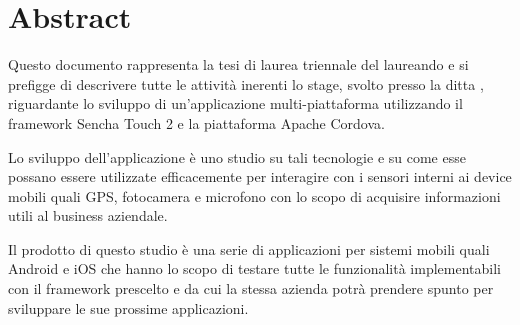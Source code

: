 \begingroup
\let\clearpage\relax
\let\cleardoublepage\relax
\let\cleardoublepage\relax

\chapter*{Abstract}
Questo documento rappresenta la tesi di laurea triennale del laureando \myName e si prefigge di descrivere tutte le attività inerenti lo stage, svolto presso la ditta \myCompany , riguardante lo sviluppo di un'applicazione multi-piattaforma utilizzando il framework Sencha Touch 2 e la piattaforma Apache Cordova.

Lo sviluppo dell'applicazione è uno studio su tali tecnologie e su come esse possano essere utilizzate efficacemente per interagire con i sensori interni ai device mobili quali GPS, fotocamera e microfono con lo scopo di acquisire informazioni utili al business aziendale.

Il prodotto di questo studio è una serie di applicazioni per sistemi mobili quali Android e iOS che hanno lo scopo di testare tutte le funzionalità implementabili con il framework prescelto e da cui la stessa azienda potrà prendere spunto per sviluppare le sue prossime applicazioni.



\endgroup

\vfill